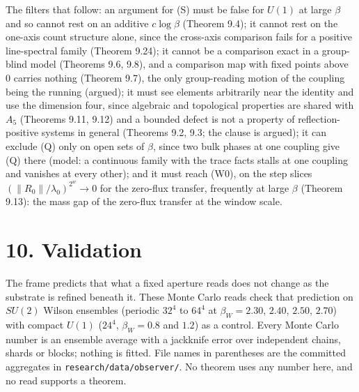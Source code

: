 \documentclass[10pt,letterpaper,twocolumn]{article}
\begin{document}
The filters that follow: an argument for (S) must be false for \(U(1)\) at large \(\beta\) and so cannot rest on an additive \(c\log\beta\) (Theorem 9.4); it cannot rest on the one-axis count structure alone, since the cross-axis comparison fails for a positive line-spectral family (Theorem 9.24); it cannot be a comparison exact in a group-blind model (Theorems 9.6, 9.8), and a comparison map with fixed points above \(0\) carries nothing (Theorem 9.7), the only group-reading motion of the coupling being the running (argued); it must see elements arbitrarily near the identity and use the dimension four, since algebraic and topological properties are shared with \(A_5\) (Theorems 9.11, 9.12) and a bounded defect is not a property of reflection-positive systems in general (Theorems 9.2, 9.3; the clause is argued); it can exclude (Q) only on open sets of \(\beta\), since two bulk phases at one coupling give (Q) there (model: a continuous family with the trace facts stalls at one coupling and vanishes at every other); and it must reach (W0), on the step slices \((\|R_0\|/\lambda_0)^{2^w}\to0\) for the zero-flux transfer, frequently at large \(\beta\) (Theorem 9.13): the mass gap of the zero-flux transfer at the window scale.

\section{10. Validation}\label{10-validation}

The frame predicts that what a fixed aperture reads does not change as the substrate is refined beneath it. These Monte Carlo reads check that prediction on \(SU(2)\) Wilson ensembles (periodic \(32^4\) to \(64^4\) at \(\beta_W=2.30\), \(2.40\), \(2.50\), \(2.70\)) with compact \(U(1)\) (\(24^4\), \(\beta_W=0.8\) and \(1.2\)) as a control. Every Monte Carlo number is an ensemble average with a jackknife error over independent chains, shards or blocks; nothing is fitted. File names in parentheses are the committed aggregates in \texttt{research/\allowbreak{}data/\allowbreak{}observer/\allowbreak{}}. No theorem uses any number here, and no read supports a theorem.
\end{document}
